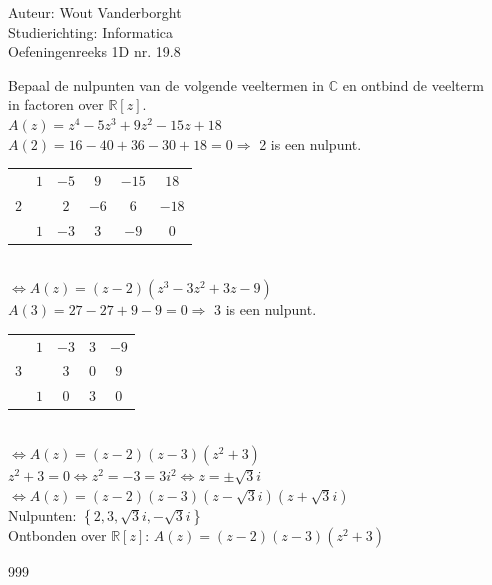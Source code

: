 \documentclass[a4paper]{article}
\newcommand{\R}{\mathbb{R}}
\newcommand{\C}{\mathbb{C}}
\begin{document}
  
\noindent \large Auteur: Wout Vanderborght\\
\noindent \large Studierichting: Informatica\\
\noindent \large Oefeningenreeks 1D nr. 19.8\\

\medskip

\normalsize

Bepaal de nulpunten van de volgende veeltermen in $\C$ en ontbind de veelterm \\

in factoren over $\R[z]$. \\

$ A(z) = z^4 - 5z^3 + 9z^2 - 15z + 18 $ \\

$ A(2) = 16 - 40 + 36 - 30 + 18 = 0 \Rightarrow $ 2 is een nulpunt. \\

\begin{tabular}{c|cccc|c}
    & $1$ & $-5$ & $9$ & $-15$ & $18$ \\
    $2$ & & $2$ & $-6$ & $6$ & $-18$ \\ \hline
    & $1$ & $-3$ & $3$ & $-9$ & $0$ \\
\end{tabular} \\

$ \Leftrightarrow A(z) = (z - 2)(z^3 - 3z^2 + 3z - 9) $ \\

$ A(3) = 27 - 27 + 9 - 9 = 0 \Rightarrow $ 3 is een nulpunt. \\

\begin{tabular}{c|ccc|c}
    & $1$ & $-3$ & $3$ & $-9$ \\
    $3$ & & $3$ & $0$ & $9$ \\ \hline
    & $1$ & $0$ & $3$ & $0$ \\
\end{tabular} \\

$ \Leftrightarrow A(z) = (z - 2)(z - 3)(z^2 + 3) $ \\

$ z^2 + 3 = 0 \Leftrightarrow z^2 = -3 = 3i^2 \Leftrightarrow z = \pm \sqrt{3}i $ \\

$ \Leftrightarrow A(z) = (z - 2)(z - 3)(z - \sqrt{3}i)(z + \sqrt{3}i) $ \\

Nulpunten: $ \left\{2, 3, \sqrt{3}i, -\sqrt{3}i\right\} $ \\

Ontbonden over $\R[z]$: $ A(z) = (z - 2)(z - 3)(z^2 + 3) $ \\

\begin{thebibliography}{999}
\end{thebibliography}
\end{document}
